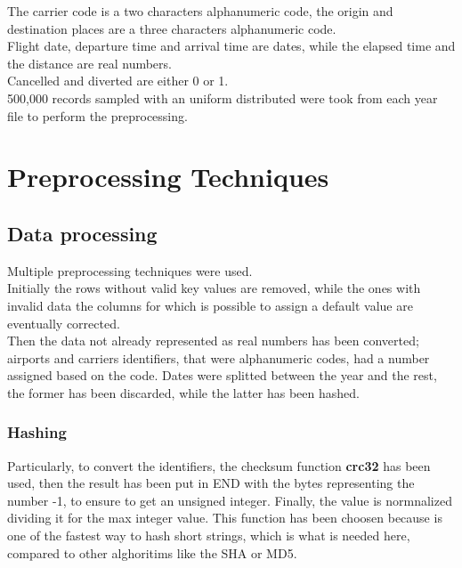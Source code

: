 \documentclass[
	letterpaper, %
	10pt, %
]{class}
\begin{document}
The carrier code is a two characters alphanumeric code, the origin and destination places are a three characters alphanumeric code.\\
Flight date, departure time and arrival time are dates, while the elapsed time and the distance are real numbers.\\
Cancelled and diverted are either 0 or 1.\\

500,000 records sampled with an uniform distributed were took from each year file to perform the preprocessing.


\section{Preprocessing Techniques}

\subsection{Data processing}

Multiple preprocessing techniques were used.\\

Initially the rows without valid key values are removed, while the ones with invalid data the columns for which is possible to assign a default value are eventually corrected.\\

Then the data not already represented as real numbers has been converted; airports and carriers identifiers, that were alphanumeric codes, had a number assigned based on the code. Dates were splitted between the year and the rest, the former has been discarded, while the latter has been hashed.\\

\subsubsection{Hashing}

Particularly, to convert the identifiers, the checksum function \textbf{crc32} \cite{crc32} has been used, then the result has been put in END with the bytes representing the number -1, to ensure to get an unsigned integer. Finally, the value is normnalized dividing it for the max integer value.
This function has been choosen because is one of the fastest way to hash short strings, which is what is needed here, compared to other alghoritims like the SHA or MD5.\\
\end{document}
